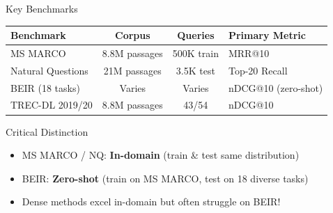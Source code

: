 \documentclass[aspectratio=169]{beamer}
\newif\ifanimated
\newcommand{\cpause}{\ifanimated\pause\fi}
\begin{document}
\begin{frame}{Key Benchmarks}
\begin{table}
\centering
\small
\begin{tabular}{lccl}
\toprule
\textbf{Benchmark} & \textbf{Corpus} & \textbf{Queries} & \textbf{Primary Metric} \\
\midrule
MS MARCO & 8.8M passages & 500K train & MRR@10 \\
Natural Questions & 21M passages & 3.5K test & Top-20 Recall \\
BEIR (18 tasks) & Varies & Varies & nDCG@10 (zero-shot) \\
TREC-DL 2019/20 & 8.8M passages & 43/54 & nDCG@10 \\
\bottomrule
\end{tabular}
\end{table}

\cpause
\vspace{0.5em}

\begin{alertblock}{Critical Distinction}
\begin{itemize}
    \item MS MARCO / NQ: \textbf{In-domain} (train \& test same distribution)
    \item BEIR: \textbf{Zero-shot} (train on MS MARCO, test on 18 diverse tasks)
    \item Dense methods excel in-domain but often struggle on BEIR!
\end{itemize}
\end{alertblock}
\end{frame}
\end{document}
